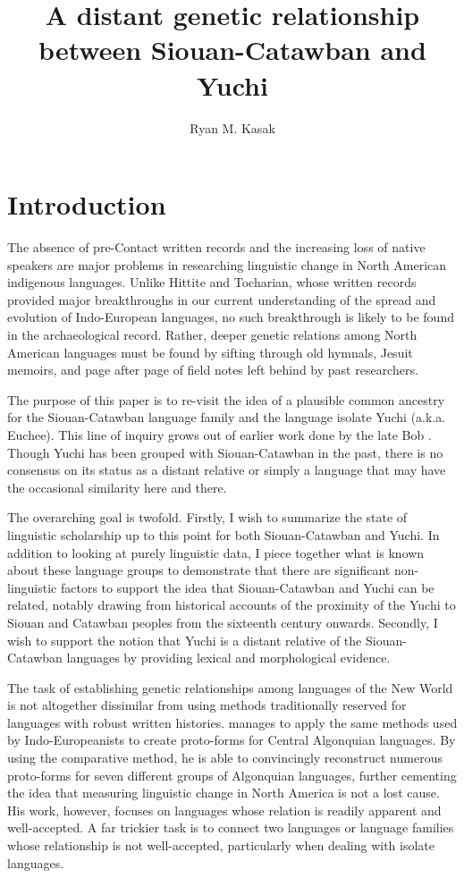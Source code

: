 \documentclass[output=paper]{LSP/langsci}
\author{Ryan M. Kasak}
\title{A distant genetic relationship between Siouan-Catawban and Yuchi}
\begin{document}
\section{Introduction}\label{sec:kasak:1}

The absence of pre-Contact written records and the increasing loss of native speakers are major problems in researching linguistic change in North American indigenous languages. Unlike Hittite and Tocharian, whose written records provided major breakthroughs in our current understanding of the spread and evolution of Indo-European languages, no such breakthrough is likely to be found in the archaeological record. Rather, deeper genetic relations among North American languages must be found by sifting through old hymnals, Jesuit memoirs, and page after page of field notes left behind by past researchers.

The purpose of this paper is to re-visit the idea of a plausible common ancestry for the Siouan-Catawban language family and the language isolate Yuchi (a.k.a. Euchee). This line of inquiry grows out of earlier work done by the late Bob \citet{Rankin1996,Rankin1998scy}. Though Yuchi has been grouped with Siouan-Catawban in the past, there is no consensus on its status as a distant relative or simply a language that may have the occasional similarity here and there.

The overarching goal is twofold. Firstly, I wish to summarize the state of linguistic scholarship up to this point for both Siouan-Catawban and Yuchi. In addition to looking at purely linguistic data, I piece together what is known about these language groups to demonstrate that there are significant non-linguistic factors to support the idea that Siouan-Catawban and Yuchi can be related, notably drawing from historical accounts of the proximity of the Yuchi to Siouan and Catawban peoples from the sixteenth century onwards. Secondly, I wish to support the notion that Yuchi is a distant relative of the Siouan-Catawban languages by providing lexical and morphological evidence.

The task of establishing genetic relationships among languages of the New World is not altogether dissimilar from using methods traditionally reserved for languages with robust written histories. \citet{Bloomfield1925} manages to apply the same methods used by Indo-Europeanists to create proto-forms for Central Algonquian languages. By using the comparative method, he is able to convincingly reconstruct numerous proto-forms for seven different groups of Algonquian languages, further cementing the idea that measuring linguistic change in North America is not a lost cause. His work, however, focuses on languages whose relation is readily apparent and well-accepted. A far trickier task is to connect two languages or language families whose relationship is not well-accepted, particularly when dealing with isolate languages. 
\end{document}

